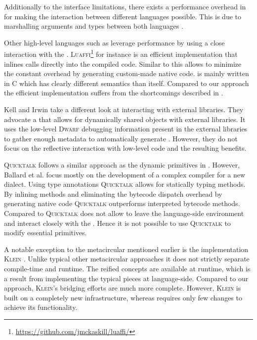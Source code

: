 Additionally to the interface limitations, there exists a performance overhead in \FFI for making the interaction between different languages possible. 
This is due to marshalling arguments and types between both languages \cite{Fish00a,Repp06b}.


Other high-level languages such as \Lua leverage \FFI performance by using a close interaction with the \JIT.
\textsc{Luaffi}\footnote{\url{https://github.com/jmckaskill/luaffi/}} for instance is an efficient \Lua implementation that inlines \FFI calls directly into the \JIT compiled code.
Similar to \B this allows to minimize the constant overhead by generating custom-made native code.
\Luajit is mainly written in C which has clearly different semantics than \Lua itself.
Compared to our approach the efficient \VM implementation suffers from the shortcomings described in . 

Kell and Irwin \cite{Kell11a} take a different look at interacting with external libraries.
They advocate a \Python \VM that allows for dynamically shared objects with external libraries.
It uses the low-level \textsc{Dwarf} debugging information present in the external libraries to gather enough metadata to automatically generate \FFIs.
However, they do not focus on the reflective interaction with low-level code and the resulting benefits. 

\textsc{Quicktalk} \cite{Ball86a} follows a similar approach as the dynamic primitives in \WF.
However, Ballard et al. focus mostly on the development of a complex compiler for a new \ST dialect.
Using type annotations \textsc{Quicktalk} allows for statically typing methods.
By inlining methods and eliminating the bytecode dispatch overhead by generating native code \textsc{Quicktalk} outperforms interpreted bytecode methods.
Compared to \WF \textsc{Quicktalk} does not allow to leave the language-side environment and interact closely with the \VM.
Hence it is not possible to use \textsc{Quicktalk} to modify essential primitives.

A notable exception to the metacircular \VMs mentioned earlier is the \Self implementation \textsc{Klein} \cite{Unga05a}.
Unlike typical other metacircular approaches it does not strictly separate compile-time and runtime.
The reified \VM concepts are available at runtime, which is a result from implementing the typical \VM pieces at language-side.
Compared to our approach, \textsc{Klein}'s bridging efforts are much more complete.
However, \textsc{Klein} is built on a completely new \VM infrastructure, whereas \B requires only few changes to achieve its functionality.

